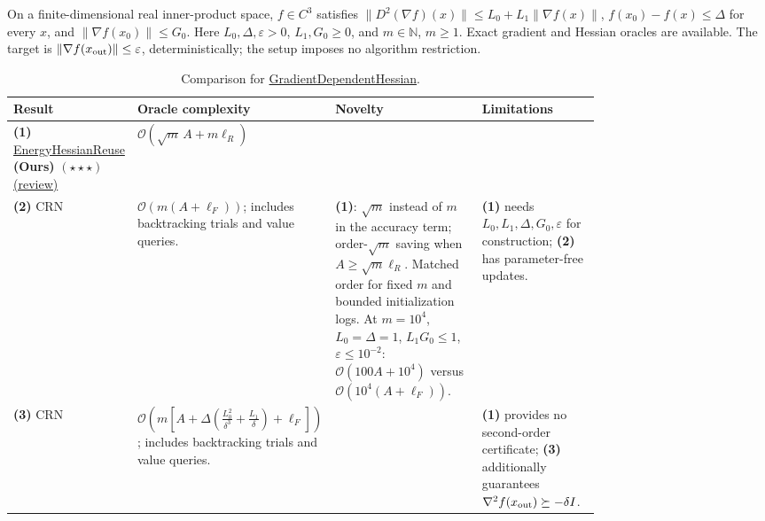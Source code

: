 \begin{table}[tp]
\centering
\caption{Comparison for \href{https://github.com/k3nfalt/longtails/blob/main/LongTails/Setups/GradientDependentHessian.lean}{GradientDependentHessian}.}\label{tab:GradientDependentHessian}
\parbox{\linewidth}{\footnotesize On a finite-dimensional real inner-product space, $f\in C^3$ satisfies $\|D^2(\nabla f)(x)\|\le L_0+L_1\|\nabla f(x)\|$, $f(x_0)-f(x)\le\Delta$ for every $x$, and $\|\nabla f(x_0)\|\le G_0$. Here $L_0,\Delta,\varepsilon>0$, $L_1,G_0\ge0$, and $m\in\mathbb N$, $m\ge1$. Exact gradient and Hessian oracles are available. The target is $\|\nabla f(x_{\rm out})\|\le\varepsilon$, deterministically; the setup imposes no algorithm restriction.}\par\smallskip
\begin{threeparttable}
\footnotesize
\setlength{\tabcolsep}{4pt}\renewcommand{\arraystretch}{1.25}
\begin{tabularx}{\linewidth}{@{}>{\raggedright\arraybackslash}p{0.20\linewidth}>{\raggedright\arraybackslash}p{0.32\linewidth}>{\raggedright\arraybackslash}p{0.25\linewidth}>{\raggedright\arraybackslash}X@{}}
\toprule
\textbf{Result} & \textbf{Oracle complexity} & \textbf{Novelty} & \textbf{Limitations} \\
\midrule
\textbf{(1)} \href{https://github.com/k3nfalt/longtails/blob/main/LongTails/Theorems/EnergyHessianReuse.lean}{Energy\allowbreak Hessian\allowbreak Reuse} \textbf{(Ours)} $(\star\star\star)$ \href{https://github.com/k3nfalt/longtails/blob/main/scripts/reviews/EnergyHessianReuse.md}{(review)}
& $\mathcal{O}\!\left(\sqrt m\,A+m\ell_R\right)$ & & \\
\midrule[1.2pt]
\textbf{(2)} CRN \citep[Cor.~1, $\delta=\infty$]{gdhFang2026v1}
& $\mathcal{O}\!\left(m(A+\ell_F)\right)$; includes backtracking trials and value queries.
& \textbf{(1)}: $\sqrt m$ instead of $m$ in the accuracy term; order-$\sqrt m$ saving when $A\ge\sqrt m\ell_R$. Matched order for fixed $m$ and bounded initialization logs. At $m=10^4$, $L_0=\Delta=1$, $L_1G_0\le1$, $\varepsilon\le10^{-2}$: $\mathcal{O}(100A+10^4)$ versus $\mathcal{O}(10^4(A+\ell_F))$.
& \textbf{(1)} needs $L_0,L_1,\Delta,G_0,\varepsilon$ for construction; \textbf{(2)} has parameter-free updates. \\
\midrule
\textbf{(3)} CRN \citep[Cor.~1, $0<\delta<\infty$]{gdhFang2026v1}
& $\mathcal{O}\!\left(m\left[A+\Delta\left(\frac{L_0^2}{\delta^3}+\frac{L_1}{\delta}\right)+\ell_F\right]\right)$; includes backtracking trials and value queries.
& & \textbf{(1)} provides no second-order certificate; \textbf{(3)} additionally guarantees $\nabla^2 f(x_{\rm out})\succeq-\delta I$. \\

\end{tabularx}
\end{threeparttable}
\end{table}
